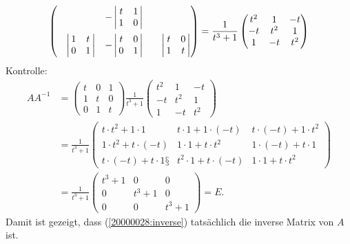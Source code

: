 \begin{loesung}
\begin{align}
\begin{pmatrix}
		&-\left|\,\begin{matrix}t&1\\1&0\end{matrix}\,\right|
			\\[11pt]
\phantom{-}\left|\,\begin{matrix}1&t\\0&1\end{matrix}\,\right|
	&-\left|\,\begin{matrix}t&0\\0&1\end{matrix}\,\right|
		&\phantom{-}\left|\,\begin{matrix}t&0\\1&t\end{matrix}\,\right|
\end{pmatrix}
=\frac1{t^3+1}
\renewcommand{\arraystretch}{1}
\begin{pmatrix}
t^2&  1& -t\\
 -t&t^2&  1\\
  1& -t&t^2
\end{pmatrix}
\label{20000028:inverse}
\end{align}
Kontrolle:
\begin{align*}
AA^{-1}
&=
\begin{pmatrix}
t&0&1\\
1&t&0\\
0&1&t
\end{pmatrix}
\frac{1}{t^3+1}
\begin{pmatrix}
t^2&  1& -t\\
 -t&t^2&  1\\
  1& -t&t^2
\end{pmatrix}
\\
&=
\frac{1}{t^3+1}
\begin{pmatrix}
t\cdot t^2+1\cdot 1
	&t\cdot 1+1\cdot(-t)
		&t\cdot(-t)+1\cdot t^2\\
1\cdot t^2+t\cdot (-t)
	&1\cdot 1+t\cdot t^2
		&1\cdot(-t)+t\cdot 1\\
t\cdot (-t)+t\cdot 1§
	&t^2\cdot 1+t\cdot (-t)
		&1\cdot 1+t\cdot t^2
\end{pmatrix}
\\
&=
\frac1{t^3+1}
\begin{pmatrix}
t^3+1&    0&    0\\
    0&t^3+1&    0\\
    0&    0&t^3+1
\end{pmatrix}=E.
\end{align*}
Damit ist gezeigt, dass (\ref{20000028:inverse}) tatsächlich die inverse Matrix
von $A$ ist.
\end{loesung}
